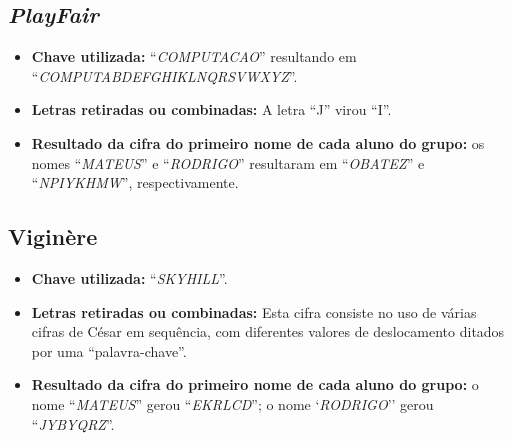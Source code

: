\documentclass[
article,			%
11pt,				%
oneside,			%
a4paper,			%
english,			%
brazil,				%
sumario=tradicional
]{abntex2}
\begin{document}
		\subsection{\textit{PlayFair}}
			\begin{itemize}
				\item \textbf{Chave utilizada:} ``\textit{COMPUTACAO}'' resultando em ``\textit{COMPUTABDEFGHIKLNQRSVWXYZ}''.
				\item \textbf{Letras retiradas ou combinadas:} A letra ``J'' virou ``I''.
				\item \textbf{Resultado da cifra do primeiro nome de cada aluno do grupo:} os nomes ``\textit{MATEUS}'' e ``\textit{RODRIGO}'' resultaram em ``\textit{OBATEZ}'' e ``\textit{NPIYKHMW}'', respectivamente.
			\end{itemize}
		
		\subsection{Viginère}
			\begin{itemize}
				\item \textbf{Chave utilizada:} ``\textit{SKYHILL}''.
				\item \textbf{Letras retiradas ou combinadas:} Esta cifra consiste no uso de várias cifras de César em sequência, com diferentes valores de deslocamento ditados por uma ``palavra-chave''.
				\item \textbf{Resultado da cifra do primeiro nome de cada aluno do grupo:} o nome ``\textit{MATEUS}'' gerou ``\textit{EKRLCD}''; o nome `\textit{RODRIGO}'' gerou ``\textit{JYBYQRZ}''.
			\end{itemize}
\end{document}
